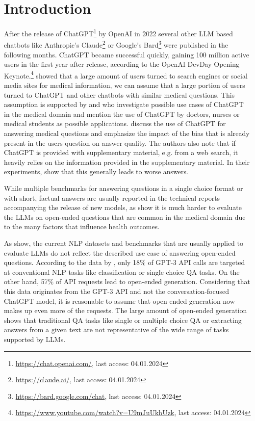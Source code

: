 \chapter{Introduction}\label{structure}
After the release of ChatGPT\footnote{\url{https://chat.openai.com/}, last access: 04.01.2024} by OpenAI in 2022 several other LLM based chatbots like Anthropic's Claude\footnote{\url{https://claude.ai/}, last access: 04.01.2024} or Google's Bard\footnote{\url{https://bard.google.com/chat}, last access: 04.01.2024} were published in the following months.
ChatGPT became successful quickly, gaining 100 million active users in the first year after release, according to the OpenAI DevDay Opening Keynote.\footnote{\url{https://www.youtube.com/watch?v=U9mJuUkhUzk}, last access: 04.01.2024}
\cite{de:2014:seeking} showed that a large amount of users turned to search engines or social media sites for medical information, we can assume that a large portion of users turned to ChatGPT and other chatbots with similar medical questions.
This assumption is supported by \cite{dave:2023:chatgpt} and \cite{khan:2023:chatgpt} who investigate possible use cases of ChatGPT in the medical domain and mention the use of ChatGPT by doctors, nurses or medical students as possible applications.
\cite{koopman:2023:dr} discuss the use of ChatGPT for answering medical questions and emphasize the impact of the bias that is already present in the users question on answer quality. 
The authors also note that if ChatGPT is provided with supplementary material, e.g. from a web search, it heavily relies on the information provided in the supplementary material.
In their experiments, \cite{koopman:2023:dr} show that this generally leads to worse answers.

While multiple benchmarks for answering questions in a single choice format or with short, factual answers are usually reported in the technical reports accompanying the release of new models, as \cite{xu:2023:A} show it is much harder to evaluate the LLMs on open-ended questions that are common in the medical domain due to the many factors that influence health outcomes.

As \cite{ouyang:2022:Training} show, the current NLP datasets and benchmarks that are usually applied to evaluate LLMs do not reflect the described use case of answering open-ended questions.
According to the data by \cite{ouyang:2022:Training}, only 18\% of GPT-3 API calls are targeted at conventional NLP tasks like classification or single choice QA tasks.
On the other hand, 57\% of API requests lead to open-ended generation.
Considering that this data originates from the GPT-3 API and not the conversation-focused ChatGPT model, it is reasonable to assume that open-ended generation now makes up even more of the requests.
The large amount of open-ended generation shows that traditional QA tasks like single or multiple choice QA or extracting answers from a given text are not representative of the wide range of tasks supported by LLMs.


